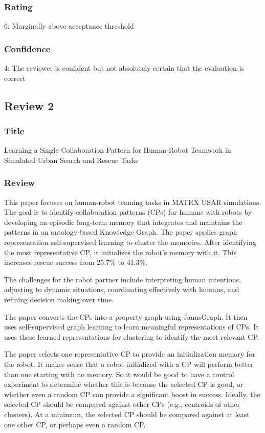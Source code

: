\documentclass[letterpaper]{article} %
\begin{document}
\subsubsection*{Rating}
6: Marginally above acceptance threshold

\subsubsection*{Confidence}
4: The reviewer is confident but not absolutely certain that the evaluation is correct

\subsection{Review 2}

\subsubsection*{Title}
Learning a Single Collaboration Pattern for Human-Robot Teamwork in Simulated Urban Search and Rescue Tasks

\subsubsection*{Review}
This paper focuses on human-robot teaming tasks in MATRX USAR simulations. The goal is to identify collaboration patterns (CPs) for humans with robots by developing an episodic long-term memory that integrates and maintains the patterns in an ontology-based Knowledge Graph. The paper applies graph representation self-supervised learning to cluster the memories. After identifying the most representative CP, it initializes the robot's memory with it. This increases rescue success from 25.7\% to 41.3\%.

The challenges for the robot partner include interpreting human intentions, adjusting to dynamic situations, coordinating effectively with humans, and refining decision making over time.

The paper converts the CPs into a property graph using JanusGraph. It then uses self-supervised graph learning to learn meaningful representations of CPs. It uses these learned representations for clustering to identify the most relevant CP.

The paper selects one representative CP to provide an initialization memory for the robot. It makes sense that a robot initialized with a CP will perform better than one starting with no memory. So it would be good to have a control experiment to determine whether this is because the selected CP is good, or whether even a random CP can provide a significant boost in success. Ideally, the selected CP should be compared against other CPs (e.g., centroids of other clusters). At a minimum, the selected CP should be compared against at least one other CP, or perhaps even a random CP.
\end{document}
